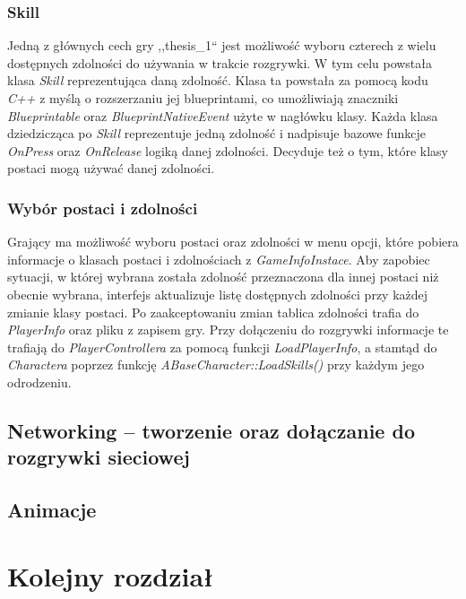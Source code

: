 \documentclass[multip]{SGGW-thesis}
\begin{document}
	\subsection{Skill}
	Jedną z głównych cech gry ,,thesis\_1`` jest możliwość wyboru czterech z wielu dostępnych zdolności do używania w trakcie rozgrywki. W tym celu powstała klasa {\em Skill} reprezentująca daną zdolność. Klasa ta powstała za pomocą kodu {\em C++} z myślą o rozszerzaniu jej blueprintami, co umożliwiają znaczniki {\em Blueprintable} oraz {\em BlueprintNativeEvent} użyte w nagłówku klasy. Każda klasa dziedzicząca po {\em Skill} reprezentuje jedną zdolność i nadpisuje bazowe funkcje {\em OnPress} oraz {\em OnRelease} logiką danej zdolności. Decyduje też o tym, które klasy postaci mogą używać danej zdolności.
	\subsection{Wybór postaci i zdolności}
		\label{wybor-postaci}
	Grający ma możliwość wyboru postaci oraz zdolności w menu opcji, które pobiera informacje o klasach postaci i zdolnościach z {\em GameInfoInstace}. Aby zapobiec sytuacji, w której wybrana została zdolność przeznaczona dla innej postaci niż obecnie wybrana, interfejs aktualizuje listę dostępnych zdolności przy każdej zmianie klasy postaci. Po zaakceptowaniu zmian tablica zdolności trafia do {\em PlayerInfo} oraz pliku z zapisem gry. Przy dołączeniu do rozgrywki informacje te trafiają do {\em PlayerControllera} za pomocą funkcji {\em LoadPlayerInfo}, a stamtąd do {\em Charactera} poprzez funkcję {\em ABaseCharacter::LoadSkills()} przy każdym jego odrodzeniu.

\section{Networking -- tworzenie oraz dołączanie do rozgrywki sieciowej}
	\label{networking}

\section{Animacje}


\chapter{Kolejny rozdział}
\end{document}
